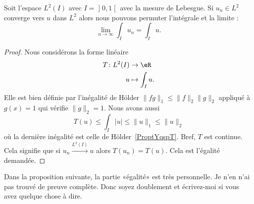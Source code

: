 \begin{corollary}        \label{CORooIIEAooNmbkTo}
	Soit l'espace \( L^2(I)\) avec \( I=\mathopen] 0 , 1 \mathclose[\) avec la mesure de Lebesgue. Si \( u_n\in L^2\) converge vers \( u\) dans \( L^2\) alors nous pouvons permuter l'intégrale et la limite :
	\begin{equation}
		\lim_{n\to \infty} \int_Iu_n=\int_Iu.
	\end{equation}
\end{corollary}

\begin{proof}
	Nous considérons la forme linéaire
	\begin{equation}
		\begin{aligned}
			T\colon L^2(I) & \to \eR           \\
			u              & \mapsto \int_Iu .
		\end{aligned}
	\end{equation}
	Elle est bien définie par l'inégalité de Hölder \( \| fg \|_1\leq \| f \|_2\| g \|_2\) appliqué à \( g(x)=1\) qui vérifie \( \| g \|_2=1\). Nous avons aussi
	\begin{equation}
		T(u)\leq \int_I| u |\leq \| u \|_1\leq\| u \|_2
	\end{equation}
	où la dernière inégalité est celle de Hölder~\ref{ProptYqspT}. Bref, \( T\) est continue. Cela signifie que si \( u_n\stackrel{L^2(I)}{\longrightarrow}u\) alors \( T(u_n)=T(u)\). Cela est l'égalité demandée.
\end{proof}

\begin{probleme}
	Dans la proposition suivante, la partie «égalité» est très personnelle. Je n'en n'ai pas trouvé de preuve complète. Donc soyez doublement  et écrivez-moi si vous avez quelque chose à dire.
\end{probleme}

